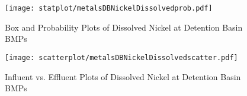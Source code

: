         \begin{figure}[hb]   %
            \centering
            \texttt{[image: statplot/metalsDBNickelDissolvedprob.pdf]}
            \caption{Box and Probability Plots of Dissolved Nickel at Detention Basin BMPs}
        \end{figure}         %
        
        
        \begin{figure}[hb]   %
            \centering
            \texttt{[image: scatterplot/metalsDBNickelDissolvedscatter.pdf]}
            \caption{Influent vs. Effluent Plots of Dissolved Nickel at Detention Basin BMPs}
        \end{figure}         %
        \clearpage
        